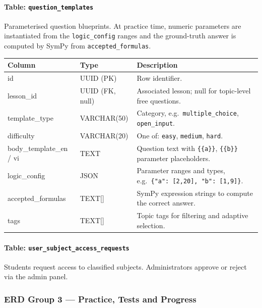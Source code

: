 \paragraph{Table: \texttt{question\_templates}}
Parameterised question blueprints. At practice time, numeric parameters are instantiated from the \texttt{logic\_config} ranges and the ground-truth answer is computed by SymPy from \texttt{accepted\_formulas}.

\begin{longtable}{|p{4.2cm}|p{3cm}|p{6.8cm}|}
\hline \textbf{Column} & \textbf{Type} & \textbf{Description} \\ \hline
id & UUID (PK) & Row identifier. \\ \hline
lesson\_id & UUID (FK, null) & Associated lesson; null for topic-level free questions. \\ \hline
template\_type & VARCHAR(50) & Category, e.g.\ \texttt{multiple\_choice}, \texttt{open\_input}. \\ \hline
difficulty & VARCHAR(20) & One of: \texttt{easy}, \texttt{medium}, \texttt{hard}. \\ \hline
body\_template\_en / vi & TEXT & Question text with \texttt{\{\{a\}\}}, \texttt{\{\{b\}\}} parameter placeholders. \\ \hline
logic\_config & JSON & Parameter ranges and types, e.g.\ \texttt{\{"a": [2,20], "b": [1,9]\}}. \\ \hline
accepted\_formulas & TEXT[] & SymPy expression strings to compute the correct answer. \\ \hline
tags & TEXT[] & Topic tags for filtering and adaptive selection. \\ \hline
\end{longtable}

\paragraph{Table: \texttt{user\_subject\_access\_requests}}
Students request access to classified subjects. Administrators approve or reject via the admin panel.

\subsubsection{ERD Group 3 --- Practice, Tests and Progress}

